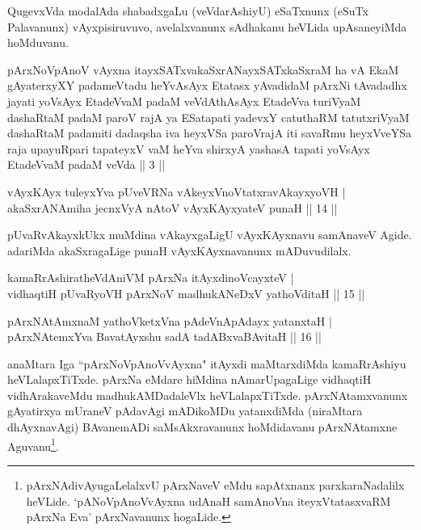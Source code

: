 \begin{artha} 
QugevxVda modalAda shabadxgaLu (veVdarAshiyU) eSaTxnunx (eSuTx 
Palavanunx) vAyxpisiruvuvo, avelalxvanunx sAdhakanu heVLida 
upAsaneyiMda hoMduvanu.
\end{artha}

\begin{kandikeshl}
pArxNoV\s pAnoV vAyxna itayxSATxvakaSxrANayxSATxkaSxraM ha vA EkaM gAyaterxyXY padameVtadu heYvAsAyx Etatasx yAvadidaM pArxNi tAvadadhx jayati yoV\s sAyx EtadeVvaM padaM veVdAthAsAyx EtadeVva turiVyaM dashaRtaM padaM paroV rajA ya ESatapati yadevxY catuthaRM tatutxriVyaM dashaRtaM padamiti dadaqsha iva heyxVSa paroVrajA iti savaRmu heyxVveYSa raja upayuRpari tapateyxV vaM heYva shirxyA yashasA tapati yoV\s sAyx EtadeVvaM padaM veVda || 3 ||
\end{kandikeshl}


\begin{shl}
vAyxKAyx tuleyxYva pUveVRNa vAkeyxVnoVtatxravAkayxyoVH | \\
akaSxrANAmiha jecnxVyA nAtoV vAyxKAyxyateV punaH \hfill ||  14 || 
\end{shl}

\begin{artha} 
pUvaRvAkayxkUkx muMdina vAkayxgaLigU vAyxKAyxnavu samAnaveV Agide. 
adariMda akaSxragaLige punaH vAyxKAyxnavanunx mADuvudilalx.
\end{artha}

\begin{shl}
kamaRrAshiratheVdAniVM pArxNa itAyxdinoVcayxteV | \\
vidhaqtiH pUvaRyoVH pArxNoV madhukANeDxV yathoVditaH \hfill ||  15 || 
\end{shl}

\begin{shl}
pArxNAtAmxnaM yathoVketxVna pAdeVnA\s \s pAdayx yatanxtaH | \\
pArxNAtemxYva BavatAyxshu sadA tadABxvaBAvitaH \hfill ||  16 || 
\end{shl}

\begin{artha} 
anaMtara Iga ``pArxNoVpAnoVvAyxna" itAyxdi maMtarxdiMda kamaRrAshiyu 
heVLalapxTiTxde. pArxNa eMdare hiMdina nAmarUpagaLige vidhaqtiH 
vidhArakaveMdu madhukAMDadaleVlx heVLalapxTiTxde. 
pArxNAtamxvanunx gAyatirxya mUraneV pAdavAgi mADikoMDu yatanxdiMda 
(niraMtara dhAyxnavAgi) BAvanemADi saMsAkxravanunx hoMdidavanu 
pArxNAtamxne Aguvanu\footnote{pArxNAdivAyugaLelalxvU pArxNaveV eMdu 
sapAtxnanx parxkaraNadalilx heVLide. `pANoV\s pAnoVvAyxna udAnaH samAnoV\s na iteyxVtatasxvaRM pArxNa Eva' pArxNavanunx hogaLide.}.
\end{artha}

